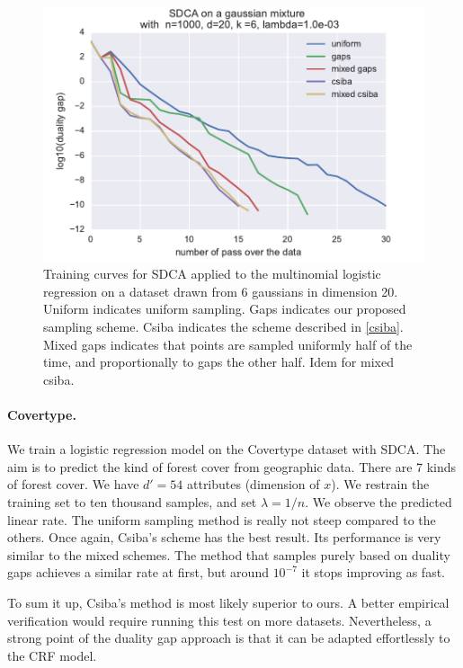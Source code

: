 \documentclass{article}
\DeclareMathOperator{\1}{\mathbb{1}}
\begin{document}
\begin{figure}[ht]
	\label{training gaussians}
	\center
	\includegraphics[width=.8\textwidth]{images/20170914_061831_gaussians_perf.pdf}
	\caption{Training curves for SDCA applied to the multinomial logistic regression on a dataset drawn from 6 gaussians in dimension 20. Uniform indicates uniform sampling. Gaps indicates our proposed sampling scheme. Csiba indicates the scheme described in \ref{csiba}. Mixed gaps indicates that points are sampled uniformly half of the time, and proportionally to gaps the other half. Idem for mixed csiba.}
\end{figure}


\paragraph{Covertype.}
We train a logistic regression model on the Covertype dataset \cite{blackard_comparative_1999} with SDCA.
The aim is to predict the kind of forest cover from geographic data. 
There are 7 kinds of forest cover.
We have $d'=54$ attributes (dimension of $x$).
We restrain the training set to ten thousand samples, and set $\lambda = 1/n$.
We observe the predicted linear rate.
The uniform sampling method is really not steep compared to the others. 
Once again, Csiba's scheme has the best result.
Its performance is very similar to the mixed schemes.
The method that samples purely based on duality gaps achieves a similar rate at first, but around $10^{-7}$ it stops improving as fast.

To sum it up, Csiba's method is most likely superior to ours.
A better empirical verification would require running this test on more datasets.
Nevertheless, a strong point of the duality gap approach is that it can be adapted effortlessly to the CRF model.
\end{document}
